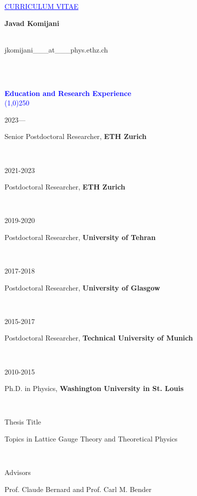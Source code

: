 \documentclass[a4paper,10pt]{article}
\newcommand{\miniLeft}[1]{\begin{minipage}[t]{0.15\textwidth} {#1} \end{minipage}}
\newcommand{\miniRight}[1]{\begin{minipage}[t]{0.85\textwidth} {#1} \end{minipage} \\}
\newcommand{\mini}[2]{\miniLeft{#1} \miniRight{#2}}
\newcommand{\Section}[1]{\linethickness{0.8mm} \textcolor{blue}{\\ {\textbf{#1}} \vspace{-3mm} \\  \line(1,0){250}} 
\\ }
\begin{document}

\vspace{-.1cm}
\par{\centering\textcolor{blue}{ \underline{CURRICULUM VITAE}\\}} %


\vspace{0.7cm} %


{\large \textbf{Javad Komijani}} \\

\vspace{-5mm}
\begin{minipage}[t]{0.40\textwidth} 
{\ }\\
{jkomijani\_\_\_at\_\_\_phys.ethz.ch}
\end{minipage}
\begin{minipage}[t]{0.60\textwidth} 
\begin{flushright}
{ }
\end{flushright}
\end{minipage} \\

\vspace{0.5cm} %

\Section{Education and Research Experience}

\mini{2023---}{{Senior Postdoctoral Researcher}, \textbf{ETH Zurich}}

\mini{2021-2023}{{Postdoctoral Researcher}, \textbf{ETH Zurich}}

\mini{2019-2020}{{Postdoctoral Researcher}, \textbf{University of Tehran}}

\mini{2017-2018}{{Postdoctoral Researcher}, \textbf{University of Glasgow}}

\mini{2015-2017}{{Postdoctoral Researcher}, \textbf{Technical University of Munich}}

\mini{2010-2015}{{Ph.D. in Physics}, \textbf{Washington University in St. Louis}}
\mini{Thesis Title}{Topics in Lattice Gauge Theory and Theoretical Physics}
\mini{Advisors}{Prof. Claude Bernard and Prof. Carl M. Bender}
\end{document}
